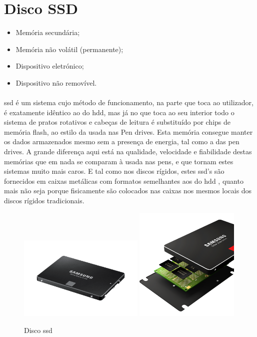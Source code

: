 \documentclass[a4paper]{report}
\begin{document}
\newpage

\section{Disco SSD}
\label{sect.ssd}

\begin{itemize}
\item Memória secundária;
\item Memória não volátil (permanente);
\item Dispositivo eletrónico;
\item Dispositivo não removível.
\end{itemize}

\paragraph*{} \ac{ssd} é um sistema cujo método de funcionamento, na parte que toca ao utilizador, é exatamente idêntico ao do \ac{hdd}, mas já no que toca ao seu interior todo o sistema de pratos rotativos e cabeças de leitura é substituído por chips de memória flash, ao estilo da usada nas Pen drives. Esta memória consegue manter os dados armazenados mesmo sem a presença de energia, tal como a das pen drives. A grande diferença aqui está na qualidade, velocidade e fiabilidade destas memórias que em nada se comparam à usada nas pens, e que tornam estes sistemas muito mais caros. E tal como nos discos rígidos, estes \ac{ssd}’s são fornecidos em caixas metálicas com formatos semelhantes aos do \ac{hdd} , quanto mais não seja porque fisicamente são colocados nas caixas nos mesmos locais dos discos rígidos tradicionais.

\begin{figure}[H]
\center
\includegraphics[width=6cm]{Imagens/imagemssd.png}
\includegraphics[width=5cm]{Imagens/discossd.png}
\caption{Disco \ac{ssd}}
\end{figure}
\end{document}
